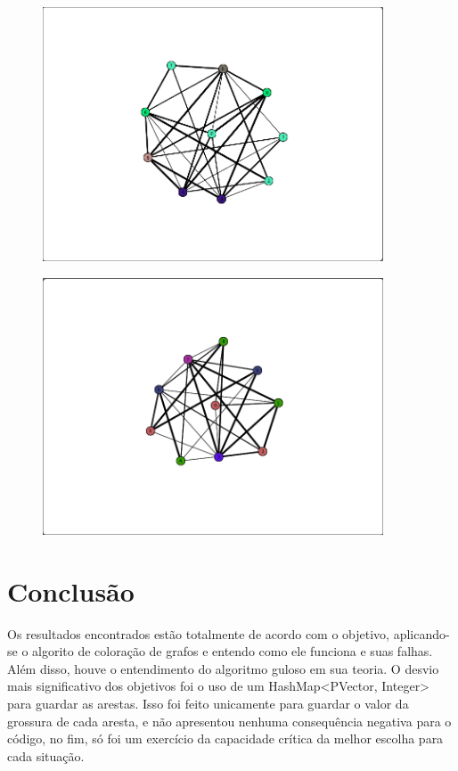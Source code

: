 \documentclass[
	12pt,				%
	oneside,			%
	a4paper,			%
	english,			%
	brazil,				%
	]{abntex2}
\begin{document}
{\begin{figure}[H]
\label{imagem 3}
\end{figure}
\begin{figure}[H]
\centering
\includegraphics[width=0.9\textwidth]{imgs/img4.png}
\label{imagem 4}
\end{figure}
\begin{figure}[H]
\centering
\includegraphics[width=0.9\textwidth]{imgs/img5.png}
\label{imagem 5}
\end{figure}

\section{Conclusão}

Os resultados encontrados estão totalmente de acordo com o objetivo, aplicando-se o algorito de coloração de grafos e entendo como ele funciona e suas falhas. Além disso, houve o entendimento do algoritmo guloso em sua teoria. O desvio mais significativo dos objetivos foi o uso de um HashMap<PVector, Integer> para guardar as arestas. Isso foi feito unicamente para guardar o valor da grossura de cada aresta, e não apresentou nenhuma consequência negativa para o código, no fim, só foi um exercício da capacidade crítica da melhor escolha para cada situação.

}
\end{document}
